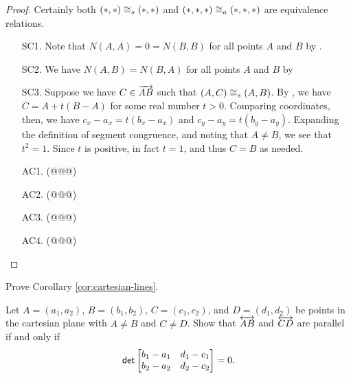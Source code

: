 \begin{proof}
Certainly both \((\ast,\ast) \cong_s (\ast,\ast)\) and \((\ast,\ast,\ast) \cong_a (\ast,\ast,\ast)\) are equivalence relations.
\begin{itemize}
\item[SC1.] Note that \(N(A,A) = 0 = N(B,B)\) for all points \(A\) and \(B\) by .

\item[SC2.] We have \(N(A,B) = N(B,A)\) for all points \(A\) and \(B\) by 

\item[SC3.] Suppose we have \(C \in \overrightarrow{AB}\) such that \((A,C) \cong_s (A,B)\).
By , we have \(C = A + t(B - A)\) for some real number \(t > 0\).
Comparing coordinates, then, we have \(c_x - a_x = t(b_x - a_x)\) and \(c_y - a_y = t(b_y - a_y)\).
Expanding the definition of segment congruence, and noting that \(A \neq B\), we see that \(t^2 = 1\).
Since \(t\) is positive, in fact \(t = 1\), and thus \(C = B\) as needed.

\item[AC1.] (@@@)

\item[AC2.] (@@@)

\item[AC3.] (@@@)

\item[AC4.] (@@@)
\end{itemize}
\end{proof}




\Exercises%

\begin{exercise}
Prove Corollary \ref{cor:cartesian-lines}.
\end{exercise}

\begin{exercise} \label{exerc:parallels-in-rr2}
Let \(A = (a_1,a_2)\), \(B = (b_1,b_2)\), \(C = (c_1,c_2)\), and \(D = (d_1,d_2)\) be points in the cartesian plane with \(A \neq B\) and \(C \neq D\).
Show that \(\overleftrightarrow{AB}\) and \(\overleftrightarrow{CD}\) are parallel if and only if \[ \mathsf{det} \begin{bmatrix} b_1 - a_1 & d_1 - c_1 \\ b_2 - a_2 & d_2 - c_2 \end{bmatrix} = 0. \]
\end{exercise}



